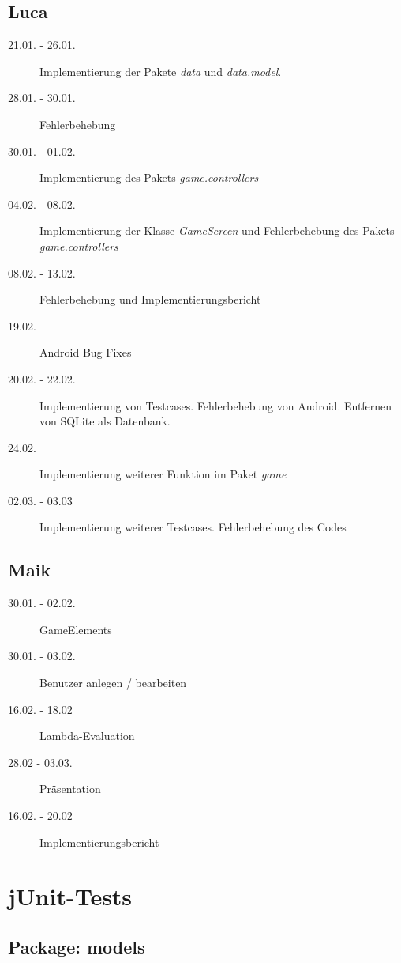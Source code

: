 \documentclass[parskip=full]{scrreprt}
\begin{document}
\section{Luca}

\begin{description}
\item[21.01. - 26.01.]
Implementierung der Pakete \emph{data} und \emph{data.model}.
\item[28.01. - 30.01.]
Fehlerbehebung
\item[30.01. - 01.02.]
Implementierung des Pakets \emph{game.controllers}
\item[04.02. - 08.02.]
Implementierung der Klasse \emph{GameScreen} und Fehlerbehebung des Pakets \emph{game.controllers}
\item[08.02. - 13.02.]
Fehlerbehebung und Implementierungsbericht
\item[19.02.]
Android Bug Fixes
\item[20.02. - 22.02.]
Implementierung von Testcases. Fehlerbehebung von Android. Entfernen von SQLite als Datenbank.
\item[24.02.]
Implementierung weiterer Funktion im Paket \emph{game}
\item[02.03. - 03.03]
Implementierung weiterer Testcases. Fehlerbehebung des Codes
\end{description}

\section{Maik}
\begin{description}
\item[30.01. - 02.02.] GameElements
\item[30.01. - 03.02.] Benutzer anlegen / bearbeiten
\item[16.02. - 18.02] Lambda-Evaluation
\item[28.02 - 03.03.] Präsentation
\item[16.02. - 20.02] Implementierungsbericht
\end{description}

\chapter{jUnit-Tests}

\section{Package: models}
\end{document}

